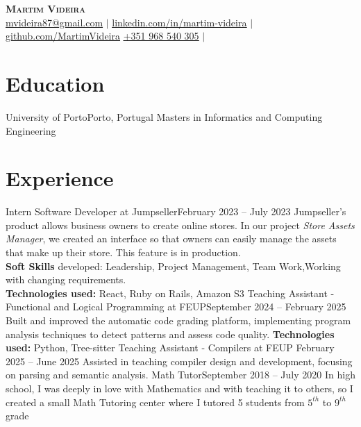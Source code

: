 



\begin{center}
    \textbf{\Huge \scshape Martim Videira} \\ \vspace{1pt}
    \href{mailto:mvideira87@gmail.com}{\underline{mvideira87@gmail.com}} $|$ 
    \href{https://www.linkedin.com/in/martim-videira-aa766b24b/}{\underline{linkedin.com/in/martim-videira}} $|$
    \href{https://github.com/MartimVideira}{\underline{github.com/MartimVideira}}
    \href{tel:351968540305}{\underline{+351 968 540 305}} $|$
\end{center}


\section{Education}
  \resumeSubHeadingListStart
    \resumeSubheading
      {University of Porto}{Porto, Portugal}
      {Masters in Informatics and Computing Engineering}{}
      \resumeItemListStart
      \resumeItemListEnd
  \resumeSubHeadingListEnd

\section{Experience}
  \resumeSubHeadingListStart
    \resumeSubheading
      {Intern Software Developer at Jumpseller}{February 2023 -- July 2023}
      {}{}
    Jumpseller's product allows business owners to create online stores. In our project \emph{Store Assets Manager}, we created an interface so that owners can easily manage the assets that make up their store. This feature is in production.
    {\\ \textbf{Soft Skills} developed: Leadership, Project Management, Team Work,Working with changing requirements.\\}
    {\textbf{Technologies used:} React, Ruby on Rails, Amazon S3}
    \resumeSubheading
      {Teaching Assistant - \small{Functional and Logical Programming at FEUP}}{September 2024 -- February 2025}{}{}
      {Built and improved the automatic code grading platform, implementing program analysis techniques to detect patterns and assess code quality.}
    {\textbf{Technologies used:} Python, Tree-sitter}
    \resumeSubheading
      {Teaching Assistant - \small{Compilers at FEUP} }{February 2025 -- June 2025}{}{}
      {Assisted in teaching compiler design and development, focusing on parsing and semantic analysis.}
    \resumeSubheading
      {Math Tutor}{September 2018 -- July 2020}
      {}{}
    {In high school, I was deeply in love with Mathematics and with teaching it to others, so I created a small Math Tutoring center where I tutored 5 students from $5^{th}$  to $9^{th}$ grade}
  \resumeSubHeadingListEnd

